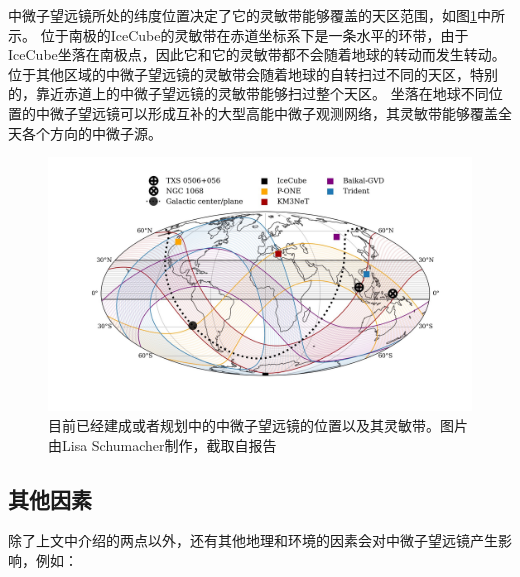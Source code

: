 中微子望远镜所处的纬度位置决定了它的灵敏带能够覆盖的天区范围，如图\ref{fig:detector_poistion_and_sensitive_band}中所示。
位于南极的IceCube的灵敏带在赤道坐标系下是一条水平的环带，由于IceCube坐落在南极点，因此它和它的灵敏带都不会随着地球的转动而发生转动。
位于其他区域的中微子望远镜的灵敏带会随着地球的自转扫过不同的天区，特别的，靠近赤道上的中微子望远镜的灵敏带能够扫过整个天区。
坐落在地球不同位置的中微子望远镜可以形成互补的大型高能中微子观测网络\cite{PLENuM:2021}，其灵敏带能够覆盖全天各个方向的中微子源。


\begin{figure}[htb]
    \centering
    \includegraphics[width=0.95\linewidth]{img/detector_poistion_and_sensitive_band.jpg}
    \caption{目前已经建成或者规划中的中微子望远镜的位置以及其灵敏带。图片由Lisa Schumacher制作，截取自报告\cite{LuLu_PeVPA:2022}}
    \label{fig:detector_poistion_and_sensitive_band}
\end{figure}


\subsection{其他因素}

除了上文中介绍的两点以外，还有其他地理和环境的因素会对中微子望远镜产生影响，例如：

